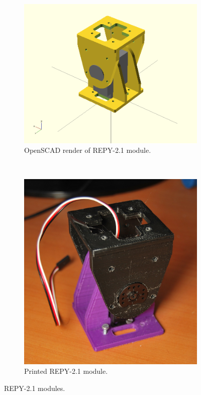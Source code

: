 \begin{figure}[H]
		\centering
        \begin{subfigure}[b]{0.4\textwidth}
                \centering
                \includegraphics[width=\textwidth]{images/Gait_osc_center_90.png}
                \caption{OpenSCAD render of REPY-2.1 module.}
                \label{fig:hardware_repy2_1_render}
        \end{subfigure}
        ~
        \begin{subfigure}[b]{0.32\textwidth}
                \centering
                \includegraphics[width=\textwidth]{images/Hardware_REPY_2_1_real.jpg}
                \caption{Printed REPY-2.1 module.}
                \label{fig:hardware_repy2_1_real}
        \end{subfigure}
        \caption{REPY-2.1 modules.} \label{fig:hardware_repy2_1}
\end{figure}



